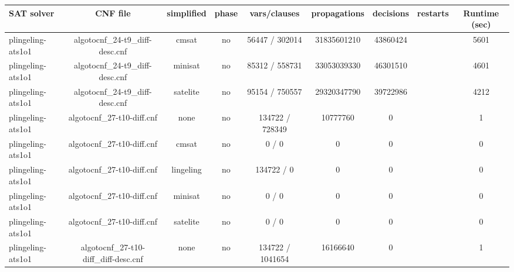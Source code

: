 \begin{appendices}
\begin{table}[p]
  \begin{center}
    \begin{tabular}{l|cccccccc}
        \textbf{SAT solver} & \textbf{CNF file} & \textbf{simplified} & \textbf{phase} & \textbf{vars/clauses} & \textbf{propagations} & \textbf{decisions} & \textbf{restarts} & \textbf{Runtime (sec)} \\
      \hline
  plingeling-ats1o1              & algotocnf\_24-t9\_diff-desc.cnf & cmsat      & no    & 56447 / 302014 & 31835601210 & 43860424  &            & 5601 \\ %
  plingeling-ats1o1              & algotocnf\_24-t9\_diff-desc.cnf & minisat    & no    & 85312 / 558731 & 33053039330 & 46301510  &            & 4601 \\ %
  plingeling-ats1o1              & algotocnf\_24-t9\_diff-desc.cnf & satelite   & no    & 95154 / 750557 & 29320347790 & 39722986  &            & 4212 \\ %
  plingeling-ats1o1              & algotocnf\_27-t10-diff.cnf     & none       & no    & 134722 / 728349 & 10777760  & 0         &            & 1 \\ %
  plingeling-ats1o1              & algotocnf\_27-t10-diff.cnf     & cmsat      & no    & 0 / 0      & 0         & 0         &            & 0 \\ %
  plingeling-ats1o1              & algotocnf\_27-t10-diff.cnf     & lingeling  & no    & 134722 / 0 & 0         & 0         &            & 0 \\ %
  plingeling-ats1o1              & algotocnf\_27-t10-diff.cnf     & minisat    & no    & 0 / 0      & 0         & 0         &            & 0 \\ %
  plingeling-ats1o1              & algotocnf\_27-t10-diff.cnf     & satelite   & no    & 0 / 0      & 0         & 0         &            & 0 \\ %
  plingeling-ats1o1              & algotocnf\_27-t10-diff\_diff-desc.cnf & none       & no    & 134722 / 1041654 & 16166640  & 0         &            & 1 \\ %

\end{tabular}
\end{center}
\end{table}
\end{appendices}
